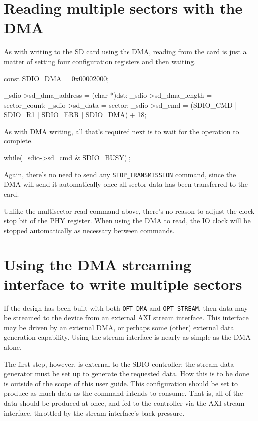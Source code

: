 \documentclass{gqtekspec}
\begin{document}
\section{Reading multiple sectors with the DMA}
As with writing to the SD card using the DMA, reading from the card is just
a matter of setting four configuration registers and then waiting.

\begin{zCpp}
	const	SDIO_DMA  = 0x00002000;

	_sdio->sd_dma_address = (char *)dst;
	_sdio->sd_dma_length = sector_count;
	_sdio->sd_data = sector;
	_sdio->sd_cmd  = (SDIO_CMD | SDIO_R1 | SDIO_ERR | SDIO_DMA) + 18;
\end{zCpp}

As with DMA writing, all that's required next is to wait for the operation to
complete.

\begin{zCpp}
	while(_sdio->sd_cmd & SDIO_BUSY)
		;
\end{zCpp}

Again, there's no need to send any {\tt STOP\_TRANSMISSION} command, since the
DMA will send it automatically once all sector data has been transferred to the
card. 

Unlike the multisector read command above, there's no reason to adjust the
clock stop bit of the PHY register.  When using the DMA to read, the IO clock
will be stopped automatically as necessary between commands.
\section{Using the DMA streaming interface to write multiple sectors}
If the design has been built with both {\tt OPT\_DMA} and
{\tt OPT\_STREAM}, then data may be streamed to the device from an
external AXI stream interface.  This interface may be driven by
an external DMA, or perhaps some (other) external data generation
capability.  Using the stream interface is nearly as simple as the
DMA alone.

The first step, however, is external to the SDIO controller: the stream
data generator must be set up to generate the requested data.  How
this is to be done is outside of the scope of this user guide.  This
configuration should be set to produce as much data as the command intends
to consume.  That is, all of the data should be produced at once, and
fed to the controller via the AXI stream interface, throttled by the
stream interface's back pressure.
\end{document}
